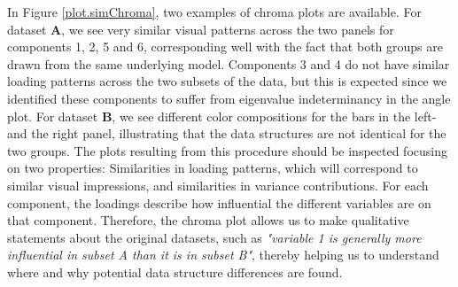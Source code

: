 \documentclass[]{interact}
\theoremstyle{plain}%
\theoremstyle{definition}
\theoremstyle{remark}
\begin{document}

In Figure  \ref{plot.simChroma}, two examples of chroma plots are available. For dataset $\mathbf{A}$, we see very similar visual patterns across the two panels for components 1, 2, 5 and 6, corresponding well with the fact that both groups are drawn from the same underlying model. Components 3 and 4 do not have similar loading patterns across the two subsets of the data, but this is expected since we identified these components to suffer from eigenvalue indeterminancy in the angle plot. For dataset $\mathbf{B}$, we see different color compositions for the bars in the left- and the right panel, illustrating that the data structures are not identical for the two groups. The plots resulting from this procedure should be inspected focusing on two properties: Similarities in loading patterns, which will correspond to similar visual impressions, and similarities in variance contributions. For each component, the loadings describe how influential the different variables are on that component. Therefore, the chroma plot allows us to make qualitative statements about the original datasets, such as \textit{"variable 1 is generally more influential in subset A than it is in subset B"}, thereby helping us to understand where and why potential data structure differences are found.
\end{document}
